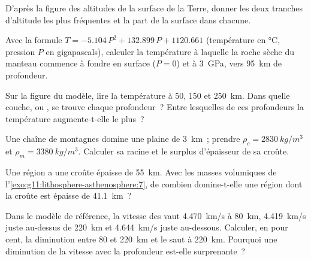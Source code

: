 \begin{exercise}[$\star$]\label{exo:g11:lithosphere-asthenosphere:4}
D'après la figure des altitudes de la surface de la Terre, donner les deux
tranches d'altitude les plus fréquentes et la part de la surface dans
chacune.
\end{exercise}

\begin{exercise}[$\star$]\label{exo:g11:lithosphere-asthenosphere:5}
Avec la formule $T = -5.104\,P^2 + 132.899\,P + 1120.661$ (température en
\unit{\celsius}, pression $P$ en gigapascals), calculer la température à
laquelle la roche sèche du manteau commence à fondre en surface ($P = 0$) et
à \qty{3}{GPa}, vers \qty{95}{km} de profondeur.
\end{exercise}

\begin{exercise}[$\star\star$]\label{exo:g11:lithosphere-asthenosphere:6}
Sur la figure du  modèle, lire la température à 50, 150 et
\qty{250}{km}. Dans quelle couche,  ou , se trouve
chaque profondeur~? Entre lesquelles de ces profondeurs la température
augmente-t-elle le plus~?
\end{exercise}

\begin{exercise}[$\star\star$]\label{exo:g11:lithosphere-asthenosphere:7}
Une chaîne de montagnes domine une plaine de \qty{3}{km}~; prendre $\rho_c =
\qty{2830}{kg/m^3}$ et $\rho_m = \qty{3380}{kg/m^3}$. Calculer sa racine et
le surplus d'épaisseur de sa croûte.
\end{exercise}

\begin{exercise}[$\star\star$]\label{exo:g11:lithosphere-asthenosphere:8}
Une région a une croûte épaisse de \qty{55}{km}. Avec les masses volumiques
de l'\cref{exo:g11:lithosphere-asthenosphere:7}, de combien domine-t-elle
une région dont la croûte est épaisse de \qty{41.1}{km}~?
\end{exercise}

\begin{exercise}[$\star\star$]\label{exo:g11:lithosphere-asthenosphere:9}
Dans le modèle de référence, la vitesse des  vaut \qty{4.470}{km/s} à
\qty{80}{km}, \qty{4.419}{km/s} juste au-dessus de \qty{220}{km} et
\qty{4.644}{km/s} juste au-dessous. Calculer, en pour cent, la diminution
entre 80 et \qty{220}{km} et le saut à \qty{220}{km}. Pourquoi une
diminution de la vitesse avec la profondeur est-elle surprenante~?
\end{exercise}


